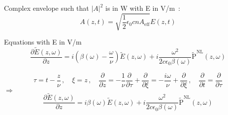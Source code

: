 \documentclass[preview]{standalone}
\newcommand{\At}{A(z, t)}
\newcommand{\Et}{E(z, t)}
\newcommand{\Ew}{\tilde{E}(z, \omega)}
\newcommand{\PNL}{\tilde{\mathrm{P}}^\mathrm{NL}}
\begin{document}
Complex envelope such that $|A|^2$ is in W with E in V/m~:
\begin{equation}
    \At = \sqrt{\frac12 \epsilon_0 c n A_\mathrm{eff}} \Et
\end{equation}

Equations with E in V/m
\begin{equation}
    \frac{\partial \Ew}{\partial z} = i\left(\beta(\omega) - \frac{\omega}{\nu} \right)\Ew + i \frac{\omega^2}{2c\epsilon_0 \beta(\omega)}\PNL(z, \omega)
\end{equation}

\begin{equation}
    \tau = t - \frac{z}{\nu}
    \,, \quad \xi = z
    \,, \quad \frac{\partial}{\partial z} = -\frac1{\nu}\frac{\partial}{\partial \tau} + \frac{\partial}{\partial \xi} = -\frac{i \omega}{\nu} + \frac{\partial}{\partial \xi}
    \,, \quad \frac{\partial}{\partial t} = \frac{\partial}{\partial \tau}
\end{equation}
$\Rightarrow$
\begin{equation}
    \frac{\partial \Ew}{\partial z} = i\beta(\omega)\Ew + i \frac{\omega^2}{2c\epsilon_0 \beta(\omega)}\PNL(z, \omega)
\end{equation}
\end{document}
